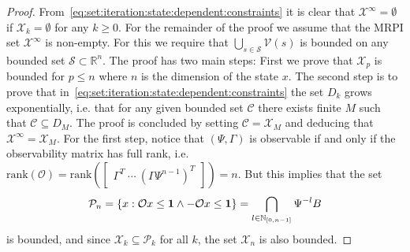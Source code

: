 \documentclass[journal]{IEEEtran}
\theoremstyle{remark}
\theoremstyle{definition}
\begin{document}
%
%
\begin{proof}
From~\eqref{eq:set:iteration:state:dependent:constraints} it is clear that $\mathcal X^\infty = \emptyset$ 
if $\mathcal X_k =\emptyset$ for any $k\geq 0$.
%
For the remainder of the proof we assume that the MRPI set $\mathcal X^\infty$ is non-empty. 
%
For this we require that $\bigcup_{s\in\mathcal S}\mathcal V(s)$ is bounded on any bounded set 
$\mathcal S\subset\mathbb R^n$.
%
The proof has two main steps: 
%
First we prove that $\mathcal X_p$ is bounded for $p\leq n$ where $n$ is the dimension of the state $x$. 
%
The second step is to prove that in~\eqref{eq:set:iteration:state:dependent:constraints}
the set $D_k$ grows exponentially, i.e. that for any given bounded set $\mathcal C$ there exists
finite $M$ such that $\mathcal C\subseteq D_{M}$. The proof is concluded by setting 
$\mathcal C = \mathcal X_{M}$ and deducing that $\mathcal X^\infty = \mathcal X_M$. 
%
For the first step, notice that $(\Psi,\Gamma)$ is observable if and only if the observability matrix 
has full rank, i.e.\ $\mathrm{rank}(\mathcal O) = \mathrm{rank}(\begin{bmatrix} \Gamma^T \ \cdots \ 
(\Gamma\Psi^{n-1})^T\end{bmatrix}) = n$.
But  this implies that the set 
%
\[
\mathcal P_{n} = \{x: 
\mathcal O x\leq{\bf{1}}\wedge-\mathcal O x\leq{\bf{1}}\} = \bigcap_{l \in \mathbb N_{[0,n-1]}} \Psi^{-l} B
\]
%
is bounded, and since $\mathcal X_k\subseteq \mathcal P_k$ for all $k$, 
the set $\mathcal X_{n}$ is also bounded.



\end{proof}
\end{document}
